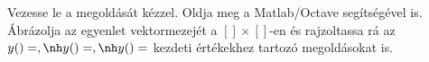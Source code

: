 Vezesse le a 
\Mat{
}
\de{} megoldását kézzel. 
Oldja meg a Matlab/Octave   segítségével is. 
Ábrázolja az egyenlet vektormezejét a $[]\times []$-en és rajzoltassa rá 
az $y()=, \nh y()=, \nh y()=$ kezdeti értékekhez tartozó megoldásokat is.


